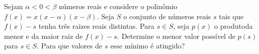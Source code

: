 Sejam $\alpha < 0 < \beta$ números reais e considere o polinômio $f(x) = x(x-\alpha)(x-\beta)$. Seja $S$ o conjunto de números reais $s$ tais que $f(x) - s$ tenha três raizes reais distintas. Para $s\in S$, seja $p(x)$ o produtoda menor e da maior raiz de $f(x)-s$. Determine o menor valor possível de $p(s)$ para $s\in S$. Para que valores de $s$ esse mínimo é atingido?
